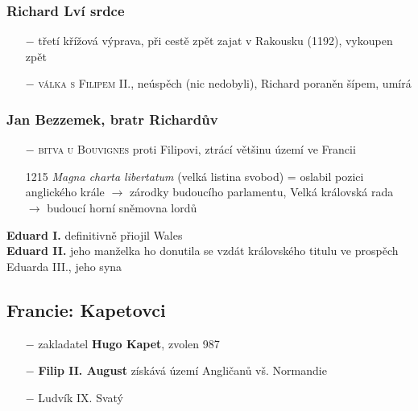 \documentclass{article}
\begin{document}
\subsubsection*{Richard Lví srdce}
\begin{itemize}
    \vspace{-0.5em}
    \setlength\itemsep{0.15em}
    \item[$-$] třetí křížová výprava, při cestě zpět zajat v Rakousku (1192), vykoupen zpět
    \item[$-$] \textsc{válka s Filipem II.}, neúspěch (nic nedobyli), Richard poraněn šípem, umírá
\end{itemize}
\subsubsection*{Jan Bezzemek, bratr Richardův}
\begin{itemize}
    \vspace{-0.5em}
    \setlength\itemsep{0.15em}
    \item[$-$] \textsc{bitva u Bouvignes} proti Filipovi, ztrácí většinu území ve Francii
    \item[1215] \textit{Magna charta libertatum} (velká listina svobod) = oslabil pozici anglického krále $\rightarrow$ zárodky budoucího parlamentu, Velká královská rada $\rightarrow$ budoucí horní sněmovna lordů
\end{itemize}
\textbf{Eduard I.} definitivně přiojil Wales\\
\textbf{Eduard II.} jeho manželka ho donutila se vzdát královského titulu ve prospěch Eduarda III., jeho syna


\subsection*{Francie: Kapetovci}
\begin{itemize}
    \vspace{-0.5em}
    \setlength\itemsep{0.15em}
    \item[$-$] zakladatel \textbf{Hugo Kapet}, zvolen 987
    \item[$-$] \textbf{Filip II. August} získává území Angličanů vš. Normandie
    \item[$-$] Ludvík IX. Svatý
\end{itemize}
\end{document}
